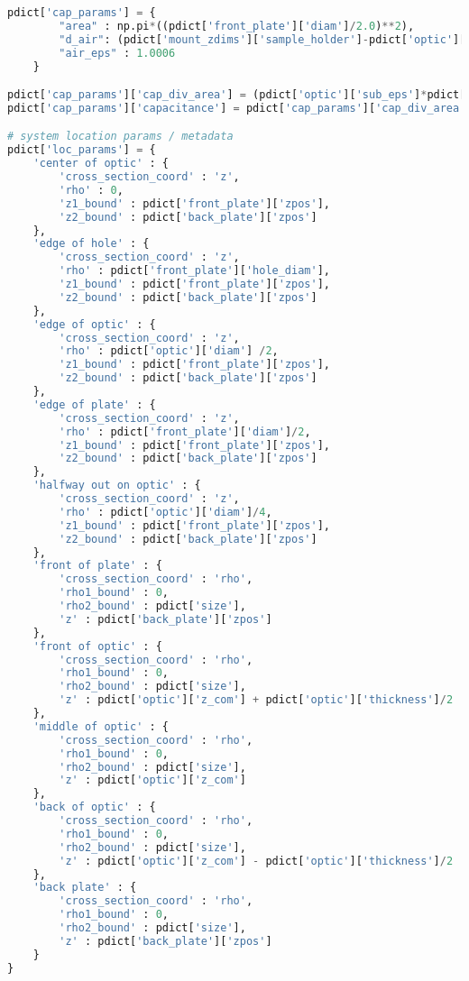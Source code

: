 \begin{lstlisting}[frame=single, language=Python]
pdict['cap_params'] = {
        "area" : np.pi*((pdict['front_plate']['diam']/2.0)**2), 
        "d_air": (pdict['mount_zdims']['sample_holder']-pdict['optic']['thickness'])/2.0, 
        "air_eps" : 1.0006
    }

pdict['cap_params']['cap_div_area'] = (pdict['optic']['sub_eps']*pdict['optic']['coat_eps']*pdict['cap_params']['air_eps'])/((2.0*pdict['optic']['sub_eps']*pdict['optic']['coat_eps']*pdict['cap_params']['d_air']) + (pdict['optic']['sub_eps']*pdict['cap_params']['air_eps']*pdict['optic']['coat_thickness']) + (pdict['optic']['coat_eps']*pdict['cap_params']['air_eps']*(pdict ['optic']['sub_thickness'])))
pdict['cap_params']['capacitance'] = pdict['cap_params']['cap_div_area']*pdict['cap_params']['area']

# system location params / metadata
pdict['loc_params'] = {
    'center of optic' : {
        'cross_section_coord' : 'z',
        'rho' : 0,
        'z1_bound' : pdict['front_plate']['zpos'],
        'z2_bound' : pdict['back_plate']['zpos']
    },
    'edge of hole' : {
        'cross_section_coord' : 'z',
        'rho' : pdict['front_plate']['hole_diam'],
        'z1_bound' : pdict['front_plate']['zpos'],
        'z2_bound' : pdict['back_plate']['zpos']
    },
    'edge of optic' : {
        'cross_section_coord' : 'z',
        'rho' : pdict['optic']['diam'] /2,
        'z1_bound' : pdict['front_plate']['zpos'],
        'z2_bound' : pdict['back_plate']['zpos']
    },
    'edge of plate' : {
        'cross_section_coord' : 'z',
        'rho' : pdict['front_plate']['diam']/2,
        'z1_bound' : pdict['front_plate']['zpos'],
        'z2_bound' : pdict['back_plate']['zpos']
    },
    'halfway out on optic' : {
        'cross_section_coord' : 'z',
        'rho' : pdict['optic']['diam']/4,
        'z1_bound' : pdict['front_plate']['zpos'],
        'z2_bound' : pdict['back_plate']['zpos']
    },
    'front of plate' : {
        'cross_section_coord' : 'rho',
        'rho1_bound' : 0,
        'rho2_bound' : pdict['size'],
        'z' : pdict['back_plate']['zpos']
    },
    'front of optic' : {
        'cross_section_coord' : 'rho',
        'rho1_bound' : 0,
        'rho2_bound' : pdict['size'],
        'z' : pdict['optic']['z_com'] + pdict['optic']['thickness']/2
    },
    'middle of optic' : {
        'cross_section_coord' : 'rho',
        'rho1_bound' : 0,
        'rho2_bound' : pdict['size'],
        'z' : pdict['optic']['z_com']
    },
    'back of optic' : {
        'cross_section_coord' : 'rho',
        'rho1_bound' : 0,
        'rho2_bound' : pdict['size'],
        'z' : pdict['optic']['z_com'] - pdict['optic']['thickness']/2
    },
    'back plate' : {
        'cross_section_coord' : 'rho',
        'rho1_bound' : 0,
        'rho2_bound' : pdict['size'],
        'z' : pdict['back_plate']['zpos']
    }
}
\end{lstlisting}
